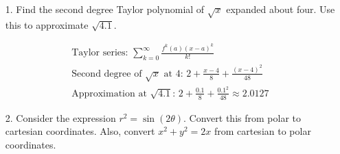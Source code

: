     \begin{itemize}
        \item [1.] Find the second degree Taylor polynomial of $\sqrt{x}$ expanded about four. Use this to approximate $\sqrt{4.1}$.
        \\
        \begin{mdframed}
            \begin{equation*}
                \begin{gathered}
                    \text{Taylor series: } \sum_{k=0}^{\infty}\frac{f^{k}(a)(x-a)^{k}}{k!}  \\
                    \text{Second degree of $\sqrt{x}$ at 4: } 
                    \boxed{2 + \frac{x-4}{8} + \frac{(x-4)^{2}}{48}}                        \\
                    \text{Approximation at $\sqrt{4.1}$: } 
                    2+\frac{0.1}{8}+\frac{0.1^{2}}{48} \approx \boxed{2.0127}
                \end{gathered}
            \end{equation*}
        \end{mdframed}

        \item [2.] Consider the expression $r^{2} = \sin(2\theta)$. Convert this from polar to cartesian coordinates. Also, convert $x^{2} + y^{2} = 2x$ from cartesian to polar coordinates.
    \end{itemize}
